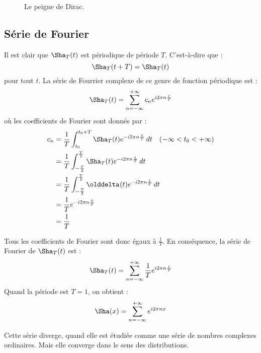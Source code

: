\begin{figure}[!ht]
    \caption{Le peigne de Dirac.}
    \label{fig:peigne-dirac}%
\end{figure}

\subsection{Série de Fourier}

Il est clair que \(\Sha_T(t)\) est périodique de période \(T\). C’est-à-dire que :
\[
    \Sha_T(t+T) = \Sha_T(t)
\]
pour tout \(t\). La s\'erie de Fourrier complexe de ce genre de fonction p\'eriodique est :
\[
    \Sha_{T}(t)=\sum_{n=-\infty}^{+\infty}c_{n}e^{i2\pi n{\frac{t}{T}}}
\]
o\`u les coefficients de Fourier sont donn\'es par :
\begin{align*}
c_n &= \frac{1}{T} \int_{t_0}^{t_0+T}\Sha_{T}(t)e^{-i2\pi n\frac{t}{T}}\,dt\quad (-\infty < t_0 < +\infty )\\
    &= \frac{1}{T} \int_{-\frac{T}{2}}^{\frac{T}{2}} \Sha_{T}(t) e^{-i2\pi n\frac{t}{T}}\,dt\\
    &= \frac{1}{T} \int_{-\frac{T}{2}}^{\frac{T}{2}} \delta(t) e^{-i2\pi n\frac{t}{T}}\,dt\\
    &= \frac{1}{T} e^{-i2\pi n\frac{0}{T}}\\
    &= \frac{1}{T}
\end{align*}

Tous les coefficients de Fourier sont donc égaux à \(\frac{1}{T}\). En
conséquence, la série de Fourier de \(\Sha_{T}(t)\) est :
\[
    \Sha_{T}(t)=\sum_{n=-\infty}^{+\infty}\frac{1}{T}e^{i2\pi n{\frac{t}{T}}}
\]
Quand la p\'eriode est \(T=1\), on obtient :
\[
    \Sha(x)=\sum_{n=-\infty}^{+\infty}e^{i2\pi n x}
\]

Cette s\'erie diverge, quand elle est \'etudi\'ee comme une s\'erie de nombres complexes 
ordinaires. Mais elle converge dans le sens des distributions.

